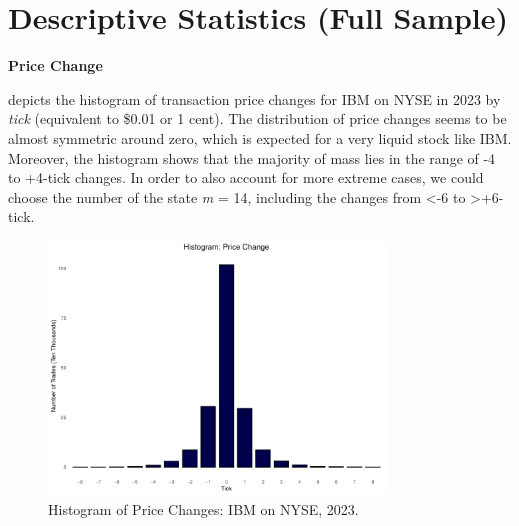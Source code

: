 \section{Descriptive Statistics (Full Sample)}

{\noindent\bfseries Price Change }

 depicts the histogram of transaction price changes for IBM on NYSE in 2023 by \textit{tick }(equivalent to \$0.01 or 1 cent). The distribution of price changes seems to be almost symmetric around zero, which is expected for a very liquid stock like IBM. Moreover, the histogram shows that the majority of mass lies in the range of -4 to +4-tick changes. In order to also account for more extreme cases, we could choose the number of the state \textit{m} = 14, including the changes from <-6 to >+6-tick. 




\begin{figure}[htbp]
    \centering
    \includegraphics[width=0.8\textwidth]{figures/descriptive stat/price_change_IBM_N_2023.pdf}
    \caption{Histogram of Price Changes: IBM on NYSE, 2023.}
    \label{fig:price-change-2023}
\end{figure}







